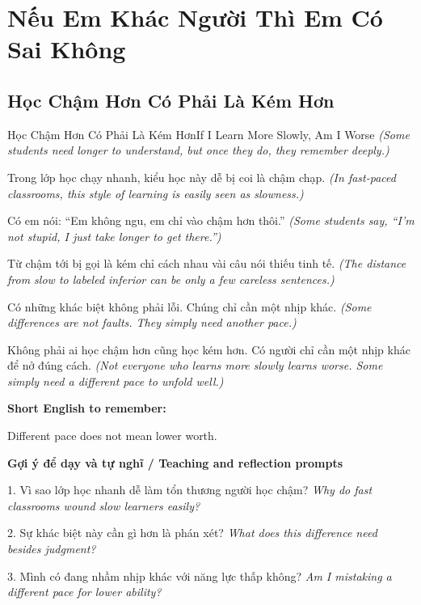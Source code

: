 \chapter{Nếu Em Khác Người Thì Em Có Sai Không}

\section{Học Chậm Hơn Có Phải Là Kém Hơn}
\begin{truyen}{Học Chậm Hơn Có Phải Là Kém Hơn}{If I Learn More Slowly, Am I Worse}
\textit{(Some students need longer to understand, but once they do, they remember deeply.)}

Trong lớp học chạy nhanh, kiểu học này dễ bị coi là chậm chạp.
\textit{(In fast-paced classrooms, this style of learning is easily seen as slowness.)}

Có em nói: “Em không ngu, em chỉ vào chậm hơn thôi.”
\textit{(Some students say, “I'm not stupid, I just take longer to get there.”)}

Từ chậm tới bị gọi là kém chỉ cách nhau vài câu nói thiếu tinh tế.
\textit{(The distance from slow to labeled inferior can be only a few careless sentences.)}

Có những khác biệt không phải lỗi. Chúng chỉ cần một nhịp khác.
\textit{(Some differences are not faults. They simply need another pace.)}

\end{truyen}

\begin{baihoc}
Không phải ai học chậm hơn cũng học kém hơn. Có người chỉ cần một nhịp khác để nở đúng cách.
\textit{(Not everyone who learns more slowly learns worse. Some simply need a different pace to unfold well.)}
\end{baihoc}

\begin{ghinhoanh}
\textbf{Short English to remember:}

Different pace does not mean lower worth.

\end{ghinhoanh}

\begin{tuhocnhanh}
\textbf{Gợi ý để dạy và tự nghĩ / Teaching and reflection prompts}

1. Vì sao lớp học nhanh dễ làm tổn thương người học chậm? \textit{Why do fast classrooms wound slow learners easily?}

2. Sự khác biệt này cần gì hơn là phán xét? \textit{What does this difference need besides judgment?}

3. Mình có đang nhầm nhịp khác với năng lực thấp không? \textit{Am I mistaking a different pace for lower ability?}
\end{tuhocnhanh}
\ngancach

